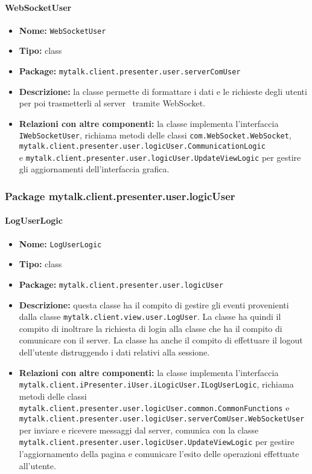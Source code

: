 \paragraph{WebSocketUser}{
	\begin{itemize}
		\item [] \textbf{Nome:} \texttt{WebSocketUser}
		\item [] \textbf{Tipo:} class
		\item [] \textbf{Package:} \texttt{mytalk.client.presenter.user.serverComUser}
		\item [] \textbf{Descrizione:}{ la classe permette di formattare i dati e le richieste degli utenti per poi trasmetterli al server\g~ tramite WebSocket\g.}
		\item [] \textbf{Relazioni con altre componenti: } la classe implementa l'interfaccia \texttt{IWebSocketUser}, richiama metodi delle classi \texttt{com.WebSocket.WebSocket}, \\
		\texttt{mytalk.client.presenter.user.logicUser.CommunicationLogic}\\
		e \texttt{mytalk.client.presenter.user.logicUser.UpdateViewLogic} per gestire gli aggiornamenti dell'interfaccia grafica.
	\end{itemize}
}


\subsubsection{Package mytalk.client.presenter.user.logicUser}
\paragraph{LogUserLogic}{
	\begin{itemize}
		\item [] \textbf{Nome:} \texttt{LogUserLogic}
		\item [] \textbf{Tipo:} class
		\item [] \textbf{Package:} \texttt{mytalk.client.presenter.user.logicUser}
		\item [] \textbf{Descrizione:} questa classe ha il compito di gestire gli eventi provenienti dalla classe \texttt{mytalk.client.view.user.LogUser}. La classe ha quindi il compito di inoltrare la richiesta di login alla classe che ha il compito di comunicare con il server\g.
		La classe ha anche il compito di effettuare il logout dell'utente distruggendo i dati relativi alla sessione.
		\item [] \textbf{Relazioni con altre componenti:} la classe implementa l'interfaccia\\ \texttt{mytalk.client.iPresenter.iUser.iLogicUser.ILogUserLogic}, richiama metodi delle classi \texttt{mytalk.client.presenter.user.logicUser.common.CommonFunctions} e  \texttt{mytalk.client.presenter.user.logicUser.serverComUser.WebSocketUser}\\ per inviare e ricevere messaggi dal server\g, comunica con la classe\\ \texttt{mytalk.client.presenter.user.logicUser.UpdateViewLogic} per gestire l'aggiornamento della pagina e comunicare l'esito delle operazioni effettuate all'utente.
	\end{itemize}
}

